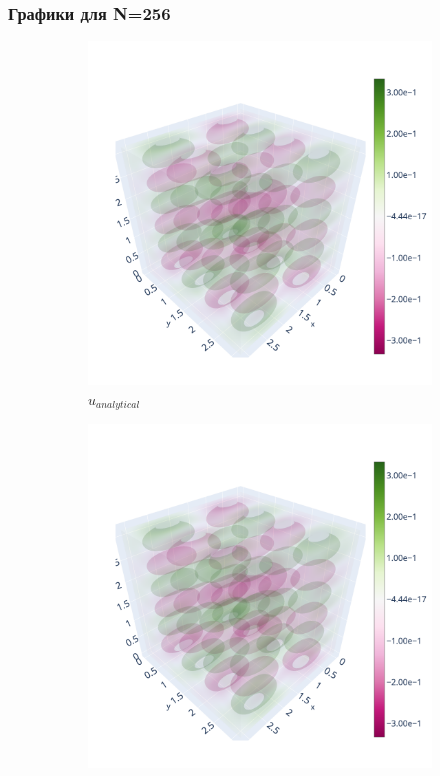 \documentclass[a4paper,hidelinks,12pt]{article}
\begin{document}
\subsubsection{Графики для N=256}

\begin{figure}[H]
\begin{subfigure}{.33\textwidth}
  \centering
  \includegraphics[width=\linewidth]{pictures/1_L1_256_analytical.png}
  \caption{$u_{analytical}$}
\end{subfigure}%
\begin{subfigure}{.33\textwidth}
  \centering
  \includegraphics[width=\linewidth]{pictures/1_L1_256_calculated.png}

\end{subfigure}
\end{figure}
\end{document}
